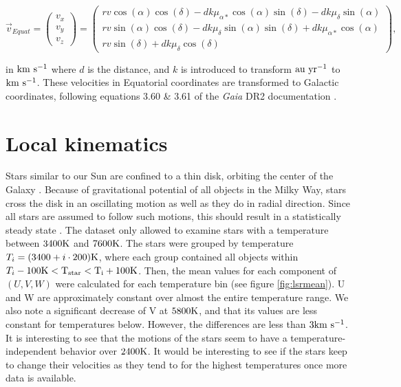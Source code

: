 \documentclass{aastex62}
\begin{document}
	\begin{equation}
	\vec{v}_{Equat} = 
	\left(
	\begin{array}{c}
	v_x\\
	v_y\\
	v_z
	\end{array}
	\right) =
	\left(
	\begin{array}{c}
	rv \cos{(\alpha)} \cos{(\delta)} - d k \mu_{\alpha*} \cos{(\alpha)} \sin{(\delta)} - d k \mu_{\delta} \sin{(\alpha)}\\
	rv \sin{(\alpha)} \cos{(\delta)} - d k  \mu_{\delta} \sin{(\alpha)} \sin{(\delta)} + d k \mu_{\alpha*} \cos{(\alpha)}\\
	rv \sin{(\delta)} + d k \mu_{\delta} \cos{(\delta)}
	\end{array}
	\right),	
	\end{equation}
	
	\noindent
	in $\rm km~s^{-1}$ where $d$ is the distance, and $k$ is introduced to transform $\rm au~yr^{-1}$ to $\rm km~s^{-1}$. These velocities in Equatorial coordinates are transformed to Galactic coordinates, following equations 3.60 \& 3.61 of the \textit{Gaia} DR2 documentation \citep{documentation}.
	
	\section{Local kinematics} \label{localkin}
	\noindent
	Stars similar to our Sun are confined to a thin disk, orbiting the center of the Galaxy \citep{keel}. Because of gravitational potential of all objects in the Milky Way, stars cross the disk in an oscillating motion as well as they do in radial direction. Since all stars are assumed to follow such motions, this should result in a statistically steady state \citep{tayler}. The dataset only allowed to examine stars with a temperature between $3400\rm K$ and $7600\rm K$. The stars were grouped by temperature $T_i=(3400+i\cdot200)\rm K$, where each group contained all objects within $T_i-100\rm K<T_{star}<T_i+100\rm K$. Then, the mean values for each component of $\left( U, V, W\right)$ were calculated for each temperature bin (see figure \ref{fig:lsrmean}). U and W are approximately constant over almost the entire temperature range. We also note a significant decrease of V at $5800\rm K$, and that its values are less constant for temperatures below. However, the differences are less than $3\rm km~s^{-1}$. It is interesting to see that the motions of the stars seem to have a temperature-independent behavior over $2400\rm K$. It would be interesting to see if the stars keep to change their velocities as they tend to for the highest temperatures once more data is available.
\end{document}

